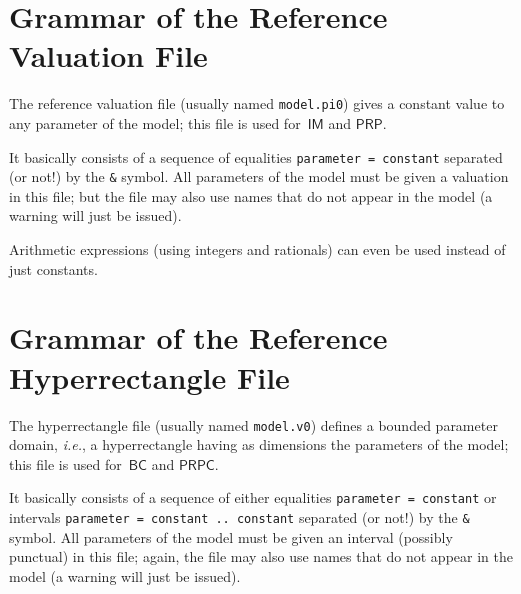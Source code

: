 \documentclass[a4paper,11pt]{report}
\makeatletter
\newcommand{\BC}{\ensuremath{\mathsf{BC}}}
\newcommand{\IM}{\ensuremath{\mathsf{IM}}}
\newcommand{\PRP}{\ensuremath{\mathsf{PRP}}}
\newcommand{\PRPC}{\ensuremath{\mathsf{PRPC}}}
\newcommand{\nt}[1]{$\langle$\emph{#1}$\rangle$}
\newcommand{\regleGrammaire}[1]{\bigskip \noindent \nt{#1} :: \\}
\newcommand{\styleIMI}[1]{\textcolor{imicolor}{\texttt{#1}}}
\newcommand{\stylePath}[1]{\textcolor{pathcolor}{\texttt{#1}}}
\newcommand{\ie}{\textcolor{colorok}{\textit{i.e.},\@}}
\makeatother
\begin{document}



\section{Grammar of the Reference Valuation File}

The reference valuation file (usually named \stylePath{model.pi0}) gives a constant value to any parameter of the model;
this file is used for~\IM{} and \PRP{}.

It basically consists of a sequence of equalities \styleIMI{parameter = constant} separated (or not!) by the \styleIMI{\&} symbol.
All parameters of the model must be given a valuation in this file; but the file may also use names that do not appear in the model (a warning will just be issued).

Arithmetic expressions (using integers and rationals) can even be used instead of just constants.



\section{Grammar of the Reference Hyperrectangle File}

The hyperrectangle file (usually named \stylePath{model.v0}) defines a bounded parameter domain, \ie{} a hyperrectangle having as dimensions the parameters of the model;
this file is used for~\BC{} and \PRPC{}.

It basically consists of a sequence of either equalities \styleIMI{parameter = constant} or intervals \styleIMI{parameter = constant .. constant} separated (or not!) by the \styleIMI{\&} symbol.
All parameters of the model must be given an interval (possibly punctual) in this file; again, the file may also use names that do not appear in the model (a warning will just be issued).
\end{document}
